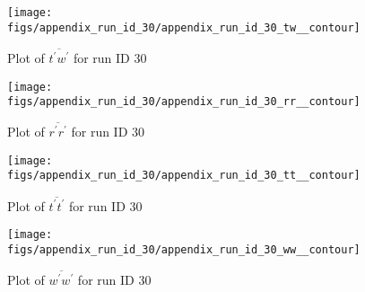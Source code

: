 \begin{figure}[H]
\centering
\texttt{[image: figs/appendix\_run\_id\_30/appendix\_run\_id\_30\_tw\_\_contour]}
\caption{Plot of $\overline{t^\prime w^\prime}$ for run ID 30}
\label{fig:appendix_run_id_30_tw__contour}
\end{figure}


\begin{figure}[H]
\centering
\texttt{[image: figs/appendix\_run\_id\_30/appendix\_run\_id\_30\_rr\_\_contour]}
\caption{Plot of $\overline{r^\prime r^\prime}$ for run ID 30}
\label{fig:appendix_run_id_30_rr__contour}
\end{figure}


\begin{figure}[H]
\centering
\texttt{[image: figs/appendix\_run\_id\_30/appendix\_run\_id\_30\_tt\_\_contour]}
\caption{Plot of $\overline{t^\prime t^\prime}$ for run ID 30}
\label{fig:appendix_run_id_30_tt__contour}
\end{figure}


\begin{figure}[H]
\centering
\texttt{[image: figs/appendix\_run\_id\_30/appendix\_run\_id\_30\_ww\_\_contour]}
\caption{Plot of $\overline{w^\prime w^\prime}$ for run ID 30}
\label{fig:appendix_run_id_30_ww__contour}
\end{figure}


